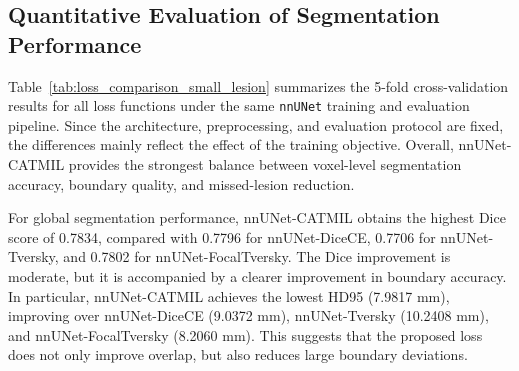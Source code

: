 \subsection{Quantitative Evaluation of Segmentation Performance}

Table~\ref{tab:loss_comparison_small_lesion} summarizes the 5-fold
cross-validation results for all loss functions under the same
\texttt{nnUNet} training and evaluation pipeline. Since the architecture,
preprocessing, and evaluation protocol are fixed, the differences mainly
reflect the effect of the training objective. Overall, nnUNet-CATMIL
provides the strongest balance between voxel-level segmentation accuracy,
boundary quality, and missed-lesion reduction.

For global segmentation performance, nnUNet-CATMIL obtains the highest
Dice score of 0.7834, compared with 0.7796 for nnUNet-DiceCE, 0.7706 for
nnUNet-Tversky, and 0.7802 for nnUNet-FocalTversky. The Dice improvement
is moderate, but it is accompanied by a clearer improvement in boundary
accuracy. In particular, nnUNet-CATMIL achieves the lowest HD95
(7.9817 mm), improving over nnUNet-DiceCE (9.0372 mm), nnUNet-Tversky
(10.2408 mm), and nnUNet-FocalTversky (8.2060 mm). This suggests that
the proposed loss does not only improve overlap, but also reduces large
boundary deviations.

\begin{center}
\label{tab:loss_comparison_small_lesion}
\end{center}

